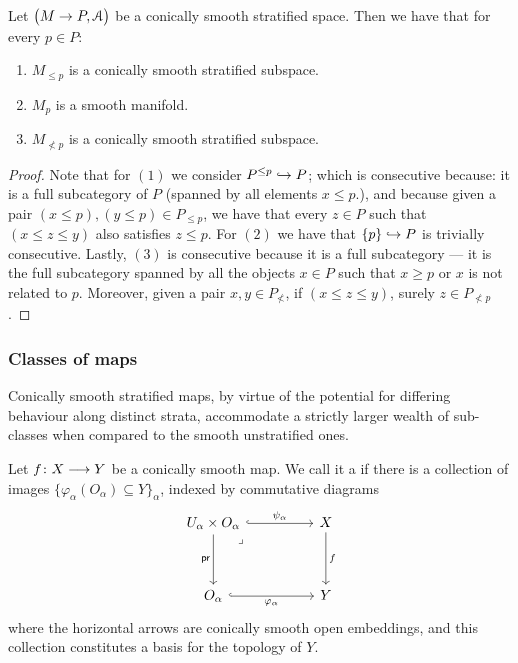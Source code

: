 \begin{cor}
    Let $\big(M \rightarrow P,\mathcal{A}\big)$ be a conically smooth stratified space. Then we have that for every $p\in P$:
    \begin{enumerate}
        \item $M_{\leq p}$ is a conically smooth stratified subspace.
        \item $M_{p}$ is a smooth manifold.
        \item $M_{\nless p}$ is a conically smooth stratified subspace.
    \end{enumerate}
\end{cor}
\begin{proof}
    Note that for $(1)$ we consider $P^{\leq p} \hookrightarrow P$; which is consecutive because: it is a full subcategory of $P$ (spanned by all elements $x\leq p$.), and because given a pair $(x\leq p), (y\leq p) \in P_{\leq p}$, we have that every $z\in P$ such that $(x \leq z \leq y)$ also satisfies $ z\leq p$. For $(2)$ we have that $\{p\} \hookrightarrow P$ is trivially consecutive. Lastly, $(3)$ is consecutive because it is a full subcategory — it is the full subcategory spanned by all the objects $x \in P$ such that $x \geq p$ or $x$ is not related to $p$. Moreover, given a pair $x,y \in P_{\nless}$, if $(x \leq z \leq y)$, surely $z\in P_{\nless p}$.      
\end{proof}

\subsubsection{Classes of maps}

Conically smooth stratified maps, by virtue of the potential for differing behaviour along distinct strata, accommodate a strictly larger wealth of sub-classes when compared to the smooth unstratified ones. 


\begin{definition}
    \label{ch4:: def: con sm subm}
    Let $f\colon X \longrightarrow Y$ be a conically smooth map. We call it a  if there is a collection of images $\{\varphi_\alpha(O_\alpha)\subseteq Y\}_\alpha$, indexed by commutative diagrams 
    \begin{equation}\label{eq:def:con sm submersion}
    \begin{tikzcd}[ampersand replacement=\&]
	{U_\alpha\times O_\alpha } \&\& X \\
	\\
	{O_\alpha} \&\& Y
	\arrow["{\psi_{\alpha}}", hook, from=1-1, to=1-3]
	\arrow["{\sf pr}"', from=1-1, to=3-1]
	\arrow["\lrcorner"{anchor=center, pos=0.125}, draw=none, from=1-1, to=3-3]
	\arrow["f", from=1-3, to=3-3]
	\arrow["{\varphi_\alpha}"', hook, from=3-1, to=3-3]
    \end{tikzcd}
    \end{equation}
    where the horizontal arrows are conically smooth open embeddings, and this collection constitutes a basis for the topology of $Y$.
\end{definition}


